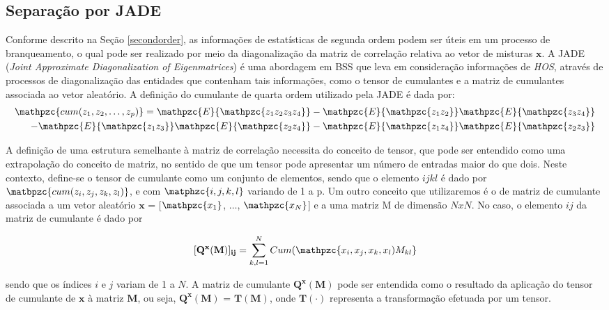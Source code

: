     \subsection{Separação por JADE}
        Conforme descrito na Seção \ref{secondorder}, as informações de estatísticas de segunda ordem podem ser úteis em um processo de branqueamento, o qual pode ser realizado por meio da diagonalização da matriz de correlação relativa ao vetor de misturas $\mathbf{x}$. A JADE (\textit{Joint Approximate Diagonalization of Eigenmatrices})\cite{JADE} é uma abordagem em BSS que leva em consideração informações de \textit{HOS}, através de processos de diagonalização das entidades que contenham tais informações, como o tensor de cumulantes e a matriz de cumulantes associada ao vetor aleatório. A definição do cumulante de quarta ordem utilizado pela JADE é dada por:
    \begin{equation}
        \label{cumJADE}
        \begin{split}
        \mathpzc{cum(z_1,z_2,\dots,z_p)} = \mathpzc{E}\{\mathpzc{z_1z_2z_3z_4}\} - \mathpzc{E}\{\mathpzc{z_1z_2}\}\mathpzc{E}\{\mathpzc{z_3z_4}\} & \\ - \mathpzc{E}\{\mathpzc{z_1z_3}\}\mathpzc{E}\{\mathpzc{z_2z_4}\} - \mathpzc{E}\{\mathpzc{z_1z_4}\}\mathpzc{E}\{\mathpzc{z_2z_3}\}    
        \end{split}
    \end{equation}
    
    A definição de uma estrutura semelhante à matriz de correlação necessita do conceito de tensor, que pode ser entendido como uma extrapolação do conceito de matriz, no sentido de que um tensor pode apresentar um número de  entradas maior do que dois. Neste contexto, define-se o tensor de cumulante como um conjunto de elementos, sendo que o elemento ${ijkl}$ é dado por $\matbpzc{cum(z_i, z_j, z_k, z_l)}$, e com $\matphzc{i,j,k,l}$ variando de 1 a p.
    Um outro conceito que utilizaremos é o de matriz de cumulante associada a um vetor aleatório $\mathbf{x}$ = [$\mathpzc{x_1}$, $\dots$,  $\mathpzc{x_N}$] e a uma matriz M de dimensão $NxN$. No caso, o elemento $ij$ da matriz de cumulante é dado por
    
    \begin{equation}
        \mathbf{[Q^x(M)]_{ij}} = \sum_{k,l=1}^N Cum(\mathpzc{x_i,x_j,x_k,x_l)M_{kl}}
    \end{equation}
    
    sendo que os índices $i$ e $j$ variam de 1 a $N$. A matriz de cumulante $\mathbf{Q^x(M)}$ pode ser entendida como o resultado da aplicação do tensor de cumulante de $\mathbf{x}$ à matriz $\mathbf{M}$, ou seja, $\mathbf{Q^x(M)}$ = $\mathbf{T(M)}$, onde $\mathbf{T(\cdot)}$ representa a transformação efetuada por um tensor.
    
